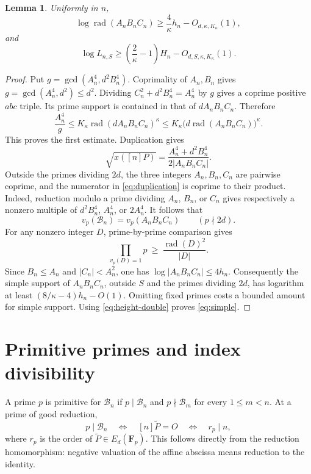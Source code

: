 \documentclass[11pt,a4paper]{article}
\newtheorem{lemma}[theorem]{Lemma}
\DeclareMathOperator{\rad}{rad}
\begin{document}
\begin{lemma}\label{lem:radical}
Uniformly in $n$,
\[
 \log\rad(A_nB_nC_n)\ge\frac4\kappa h_n
                              -O_{d,\kappa,K_\kappa}(1),
\]
and
\begin{equation}\label{eq:simple}
 \log L_{n,S}\ge\left(\frac2\kappa-1\right)H_n
                              -O_{d,S,\kappa,K_\kappa}(1).
\end{equation}
\end{lemma}
\begin{proof}
Put $g=\gcd(A_n^4,d^2B_n^4)$. Coprimality of $A_n,B_n$ gives
$g=\gcd(A_n^4,d^2)\le d^2$. Dividing
$C_n^2+d^2B_n^4=A_n^4$ by $g$ gives a coprime positive $abc$ triple.
Its prime support is contained in that of $dA_nB_nC_n$. Therefore
\[
 \frac{A_n^4}{g}\le K_\kappa\rad(dA_nB_nC_n)^\kappa
                  \le K_\kappa\bigl(d\rad(A_nB_nC_n)\bigr)^\kappa.
\]
This proves the first estimate. Duplication gives
\begin{equation}\label{eq:duplication}
 \sqrt{x([n]P)}=\frac{A_n^4+d^2B_n^4}{2|A_nB_nC_n|}.
\end{equation}
Outside the primes dividing $2d$, the three integers $A_n,B_n,C_n$
are pairwise coprime, and the numerator in \eqref{eq:duplication}
is coprime to their product. Indeed, reduction modulo a prime
dividing $A_n$, $B_n$, or $C_n$ gives respectively a nonzero
multiple of $d^2B_n^4$, $A_n^4$, or $2A_n^4$.
It follows that
\[
 v_p(\mathcal B_n)=v_p(A_nB_nC_n)\qquad(p\nmid2d).
\]
For any nonzero integer $D$, prime-by-prime comparison gives
\[
       \prod_{v_p(D)=1}p\ \ge\ \frac{\rad(D)^2}{|D|}.
\]
Since $B_n\le A_n$ and $|C_n|<A_n^2$, one has
$\log|A_nB_nC_n|\le4h_n$. Consequently the simple support of
$A_nB_nC_n$, outside $S$ and the primes dividing $2d$, has logarithm
at least $(8/\kappa-4)h_n-O(1)$.
Omitting fixed primes costs a bounded amount for simple support.
Using \eqref{eq:height-double} proves \eqref{eq:simple}.
\end{proof}

\section{Primitive primes and index divisibility}

A prime $p$ is primitive for $\mathcal B_n$ if $p\mid \mathcal B_n$ and
$p\nmid \mathcal B_m$ for every $1\le m<n$. At a prime of good reduction,
\begin{equation}\label{eq:order}
 p\mid \mathcal B_n\quad\Longleftrightarrow\quad [n]\widetilde P=O
                    \quad\Longleftrightarrow\quad r_p\mid n,
\end{equation}
where $r_p$ is the order of $\widetilde P\in E_d(\mathbf F_p)$.
This follows directly from the reduction homomorphism: negative
valuation of the affine abscissa means reduction to the identity.
\end{document}
